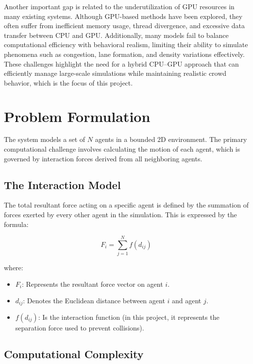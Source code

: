 \documentclass[12pt,a4paper]{report}
\begin{document}
Another important gap is related to the underutilization of GPU resources in many existing systems. Although GPU-based methods have been explored, they often suffer from inefficient memory usage, thread divergence, and excessive data transfer between CPU and GPU. Additionally, many models fail to balance computational efficiency with behavioral realism, limiting their ability to simulate phenomena such as congestion, lane formation, and density variations effectively. These challenges highlight the need for a hybrid CPU–GPU approach that can efficiently manage large-scale simulations while maintaining realistic crowd behavior, which is the focus of this project.

\chapter{Problem Formulation}

The system models a set of $N$ agents in a bounded 2D environment. The primary computational challenge involves calculating the motion of each agent, which is governed by interaction forces derived from all neighboring agents.

\section{The Interaction Model}

The total resultant force acting on a specific agent is defined by the summation of forces exerted by every other agent in the simulation. This is expressed by the formula:

\begin{equation}
F_i = \sum_{j=1}^{N} f(d_{ij})
\end{equation}

where:

\begin{itemize}
    \item $F_i$: Represents the resultant force vector on agent $i$.
    
    \item $d_{ij}$: Denotes the Euclidean distance between agent $i$ and agent $j$.
    
    \item $f(d_{ij})$: Is the interaction function (in this project, it represents the separation force used to prevent collisions).
\end{itemize}

\section{Computational Complexity}
\end{document}
